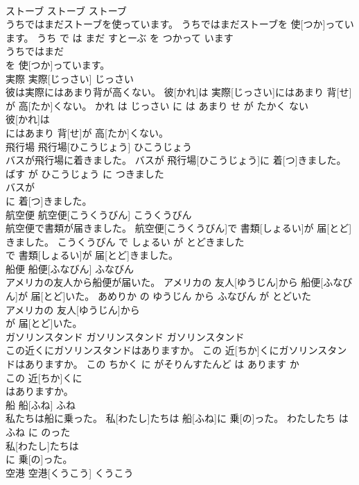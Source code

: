 \documentclass[8pt]{extreport}
\begin{document}
\begin{CJK}{UTF8}{min}
\\	ストーブ	ストーブ	ストーブ	
\\	うちではまだストーブを使っています。	うちではまだストーブを 使[つか]っています。	うち で は まだ すとーぶ を つかって います	
\\	うちではまだ
\\	を 使[つか]っています。		
\\	実際	実際[じっさい]	じっさい	
\\	彼は実際にはあまり背が高くない。	彼[かれ]は 実際[じっさい]にはあまり 背[せ]が 高[たか]くない。	かれ は じっさい に は あまり せ が たかく ない	
\\	彼[かれ]は
\\	にはあまり 背[せ]が 高[たか]くない。		
\\	飛行場	飛行場[ひこうじょう]	ひこうじょう	
\\	バスが飛行場に着きました。	バスが 飛行場[ひこうじょう]に 着[つ]きました。	ばす が ひこうじょう に つきました	
\\	バスが
\\	に 着[つ]きました。		
\\	航空便	航空便[こうくうびん]	こうくうびん	
\\	航空便で書類が届きました。	航空便[こうくうびん]で 書類[しょるい]が 届[とど]きました。	こうくうびん で しょるい が とどきました	
\\	で 書類[しょるい]が 届[とど]きました。		
\\	船便	船便[ふなびん]	ふなびん	
\\	アメリカの友人から船便が届いた。	アメリカの 友人[ゆうじん]から 船便[ふなびん]が 届[とど]いた。	あめりか の ゆうじん から ふなびん が とどいた	
\\	アメリカの 友人[ゆうじん]から
\\	が 届[とど]いた。		
\\	ガソリンスタンド	ガソリンスタンド	ガソリンスタンド	
\\	この近くにガソリンスタンドはありますか。	この 近[ちか]くにガソリンスタンドはありますか。	この ちかく に がそりんすたんど は あります か	
\\	この 近[ちか]くに
\\	はありますか。		
\\	船	船[ふね]	ふね	
\\	私たちは船に乗った。	私[わたし]たちは 船[ふね]に 乗[の]った。	わたしたち は ふね に のった	
\\	私[わたし]たちは
\\	に 乗[の]った。		
\\	空港	空港[くうこう]	くうこう	

\end{CJK}
\end{document}
